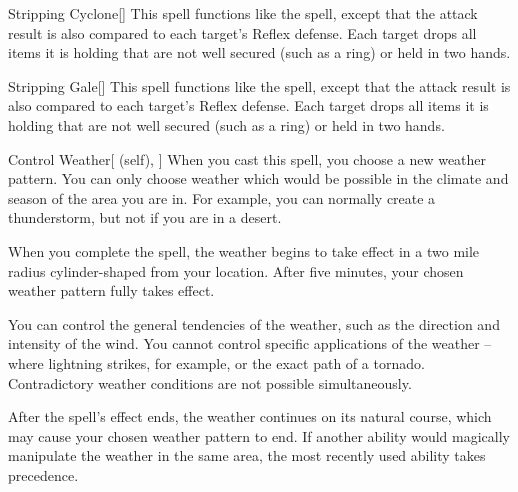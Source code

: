 \lowercase{\hypertarget{spell:Stripping Cyclone}{}}\label{spell:Stripping Cyclone}
\begin{freeability}[Rank 4]{\hypertarget{spell:Stripping Cyclone}{Stripping Cyclone}}[]
This spell functions like the  spell, except that the attack result is also compared to each target's Reflex defense.
\hit Each target drops all items it is holding that are not well secured (such as a ring) or held in two hands.
\end{freeability}
\vspace{0.25em}



\lowercase{\hypertarget{spell:Stripping Gale}{}}\label{spell:Stripping Gale}
\begin{freeability}[Rank 4]{\hypertarget{spell:Stripping Gale}{Stripping Gale}}[]
This spell functions like the  spell, except that the attack result is also compared to each target's Reflex defense.
\hit Each target drops all items it is holding that are not well secured (such as a ring) or held in two hands.
\end{freeability}
\vspace{0.25em}



\lowercase{\hypertarget{spell:Control Weather}{}}\label{spell:Control Weather}
\begin{attuneability}[Rank 5]{\hypertarget{spell:Control Weather}{Control Weather}}[ (self), ]
\targetrule
When you cast this spell, you choose a new weather pattern.
You can only choose weather which would be possible in the climate and season of the area you are in.
For example, you can normally create a thunderstorm, but not if you are in a desert.

When you complete the spell, the weather begins to take effect in a two mile radius cylinder-shaped  from your location.
After five minutes, your chosen weather pattern fully takes effect.

You can control the general tendencies of the weather, such as the direction and intensity of the wind.
You cannot control specific applications of the weather -- where lightning strikes, for example, or the exact path of a tornado.
Contradictory weather conditions are not possible simultaneously.

After the spell's effect ends, the weather continues on its natural course, which may cause your chosen weather pattern to end.
If another ability would magically manipulate the weather in the same area, the most recently used ability takes precedence.
\end{attuneability}
\vspace{0.25em}



